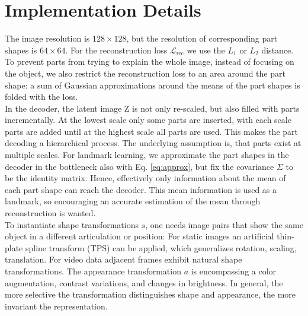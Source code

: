 	\section{Implementation Details}\label{sec:implementationdetails}
		The image resolution is $128 \times 128$, but the resolution of corresponding part shapes is $ 64 \times 64$.
		For the reconstruction  loss $\mathcal{L}_\text{rec}$ we use the $L_1$ or $L_2$ distance.
		To prevent parts from trying to explain the whole image, instead of focusing on the object, we also restrict the reconstruction loss to an area around the part shape: a sum of Gaussian approximations around the means of the part shapes is folded with the loss.\\
		In the decoder, the latent image Z is not only re-scaled, but also filled with parts incrementally.
		At the lowest scale only some parts are inserted, with each scale parts are added until at the highest scale all parts are used. This makes the part decoding a hierarchical process. The underlying assumption is, that parts exist at multiple scales.
		For landmark learning, we approximate the part shapes in the decoder in the bottleneck also with Eq. \ref{eq:approx}, but fix the covariance $\Sigma$ to be the identity matrix.
		Hence, effectively only information about the mean of each part shape can reach the decoder. This mean information is used as a landmark, so encouraging an accurate estimation of the mean through reconstruction is wanted.\\
		To instantiate shape transformations $s$, one needs image pairs that show the same object in a different articulation or position: For static images an artificial thin-plate spline transform (TPS) can be applied, which generalizes rotation, scaling, translation.
		For video data adjacent frames exhibit natural shape transformations.
		The appearance transformation $a$ is encompassing a color augmentation, contrast variations, and changes in brightness.
		In general, the more selective the transformation distinguishes shape and appearance, the more invariant the representation.
